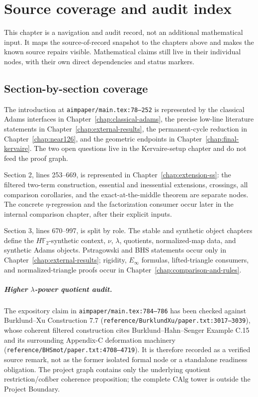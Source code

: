 \chapter{Source coverage and audit index}
\label{chap:coverage-audit}

This chapter is a navigation and audit record, not an additional mathematical
input.  It maps the source-of-record snapshot to the chapters above and makes
the known source repairs visible.  Mathematical claims still live in their
individual nodes, with their own direct dependencies and status markers.

\section{Section-by-section coverage}

The introduction at \texttt{aimpaper/main.tex:78--252} is represented by the
classical Adams interfaces in Chapter~\ref{chap:classical-adams}, the precise
low-line literature statements in Chapter~\ref{chap:external-results}, the
permanent-cycle reduction in Chapter~\ref{chap:near126}, and the geometric
endpoints in Chapter~\ref{chap:final-kervaire}.  The two open questions live
in the Kervaire-setup chapter and do not feed the proof graph.

Section 2, lines 253--669, is represented in
Chapter~\ref{chap:extension-ss}: the filtered two-term construction,
essential and inessential extensions, crossings, all comparison corollaries,
and the exact-at-the-middle theorem are separate nodes.  The concrete
$\eta$-regression and the factorization consumer occur later in the internal
comparison chapter, after their explicit inputs.

Section 3, lines 670--997, is split by role.  The stable and synthetic object
chapters define the $H\mathbb F_2$-synthetic context, $\nu$, $\lambda$,
quotients, normalized-map data, and synthetic Adams objects.  Pstragowski and
BHS statements occur only in Chapter~\ref{chap:external-results}; rigidity,
$E_\infty$ formulas, lifted-triangle consumers, and normalized-triangle proofs
occur in Chapter~\ref{chap:comparison-and-rules}.

\paragraph{Higher $\lambda$-power quotient audit.}
The expository claim in \texttt{aimpaper/main.tex:784--786} has been checked
against Burklund--Xu Construction 7.7
(\texttt{reference/BurklundXu/paper.txt:3017--3039}), whose coherent filtered
construction cites Burklund--Hahn--Senger Example C.15 and its surrounding
Appendix-C deformation machinery (\texttt{reference/BHSmot/paper.txt:4708--4719}).
It is therefore recorded as a verified source remark, not as the former
isolated formal node or a standalone readiness obligation.  The project graph
contains only the underlying quotient restriction/cofiber coherence proposition;
the complete $\mathrm{CAlg}$ tower is outside the Project Boundary.

